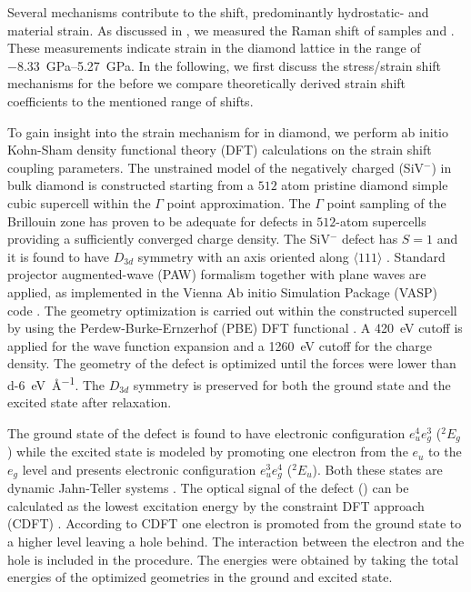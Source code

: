 	
	Several mechanisms contribute to the \cwl shift, predominantly hydrostatic- and material strain.
	As discussed in , we measured the Raman shift of samples \insituS and \implantedTao.
	These measurements indicate strain in the diamond lattice in the range of \SIrange{-8.33}{5.27}{\giga\pascal}.
	In the following, we first discuss the stress/strain shift mechanisms for the \siv before we compare theoretically derived strain shift coefficients to the mentioned range of \ZPL shifts.

	To gain insight into the strain mechanism for \sivs in diamond, we perform ab initio Kohn-Sham density functional theory (DFT) calculations on the strain \ZPL shift coupling parameters. 
	The unstrained model of the negatively charged \sivc (SiV$^{-}$) in bulk diamond is constructed starting from a $512$ atom pristine diamond simple cubic supercell within the $\Gamma$ point approximation. 
	The $\Gamma$ point sampling of the Brillouin zone has proven to be adequate for defects in $512$-atom supercells \cite{deak2014formation,kaviani2014proper} providing a sufficiently converged charge density. 
	The SiV$^{-}$ defect has $S=1$ and it is found to have $D_{3d}$ symmetry with an axis oriented along  $\langle 111 \rangle$ \cite{Goss2007}. 
	Standard projector augmented-wave (PAW) formalism together with plane waves are applied, as implemented in the Vienna Ab initio Simulation Package (VASP) code \cite{kresse1993ab,kresse1996efficiency,kresse1996efficient,kresse1999ultrasoft}. The geometry optimization is carried out within the constructed supercell by using the Perdew-Burke-Ernzerhof (PBE) DFT functional \cite{perdew1996generalized}. A \SI{420}{\eV} cutoff is applied for the wave function expansion and a \SI{1260}{\eV} cutoff for the charge density. The geometry of the defect is optimized until the forces were lower than \SI{d-6}{\eV\per\angstrom}. The $D_{3d}$ symmetry is preserved for both the ground state and the excited state after relaxation.

	The ground state of the defect is found to have electronic configuration $e^{4}_{u} e^{3}_{g}$ (${}^{2}E_{g}$) while the excited state is modeled by promoting one electron from the $e_u$ to the $e_g$ level and presents electronic configuration  $e^{3}_{u} e^{4}_{g}$ (${}^{2}E_{u}$). Both these states are dynamic Jahn-Teller systems \cite{Hepp2014, Rogers2014a}. The optical signal of the defect (\ZPL) can be calculated as the lowest excitation energy by the constraint DFT approach (CDFT) \cite{gali2009theory}. According to CDFT one electron is promoted from the ground state to a higher level leaving a hole behind. The interaction between the electron and the hole is included in the procedure. The \ZPL energies were obtained by taking the total energies of the optimized geometries in the ground and excited state.

